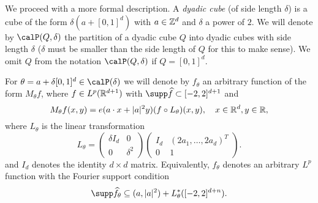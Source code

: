 We proceed with a more formal description.
A \emph{dyadic cube} (of side length $\delta$) is a cube of the form $\delta (a + [0,1]^{d})$ with $a \in \mathbb{Z}^{d}$ and $\delta$ a power of $2$.
We will denote by $\Part[Q]{\delta}$ the partition of a dyadic cube $Q$ into dyadic cubes with side length $\delta$ ($\delta$ must be smaller than the side length of $Q$ for this to make sense).
We omit $Q$ from the notation $\Part[Q]{\delta}$ if $Q=[0,1]^{d}$.

For $\theta = a + \delta [0,1]^{d} \in \Part{\delta}$ we will denote by $f_{\theta}$ an arbitrary function of the form $M_{\theta}f$, where $f \in L^{p}(\mathbb{R}^{d+1})$ with $\supp \widehat{f} \subset [-2,2]^{d+1}$ and
\begin{equation}\label{eq:parabolic-scaling}
M_{\theta}f(x,y) = e(a\cdot x + \lvert a\rvert^{2} y) (f \circ L_{\theta})(x,y),
\quad
x\in\mathbb{R}^{d}, y\in\mathbb{R},
\end{equation}
where $L_{\theta}$ is the linear transformation
\[
L_{\theta} =
\begin{pmatrix}
\delta I_{d} & 0\\
0 & \delta^{2}
\end{pmatrix}
\begin{pmatrix}
I_{d} & (2a_{1},\dotsc,2a_{d})^{T}\\
0 & 1
\end{pmatrix}.
\]
and $I_{d}$ denotes the identity $d\times d$ matrix.
Equivalently, $f_{\theta}$ denotes an arbitrary $L^{p}$ function with the Fourier support condition
\begin{equation}
\label{eq:Fourier-support}
\supp \widehat{f_{\theta}}
\subseteq
(a,\abs{a}^{2}) + L_{\theta}^{*}([-2,2]^{d+n}).
\end{equation}
\noindent{}

